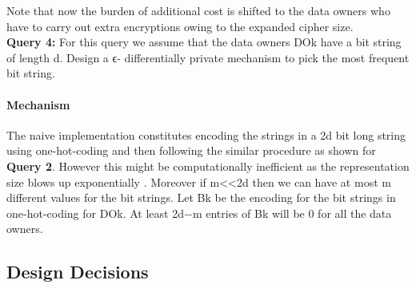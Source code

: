  Note that now the burden of additional cost is shifted to the data owners who have to carry out extra encryptions owing to the expanded cipher size.\\\textbf{Query 4:} For this query we assume that the data owners DOk  have  a bit string of length d. Design a ϵ- differentially private mechanism to pick the most frequent bit string. \paragraph{Mechanism}  The naive implementation constitutes encoding the strings in a 2d bit long string using one-hot-coding and then following the similar procedure as shown for \textbf{Query 2}. However this might be computationally inefficient  as the representation size blows up exponentially . Moreover if m<<2d then we can have at most m different values  for the bit strings. Let Bk be the encoding for the bit strings in one-hot-coding for DOk. At least 2d−m entries of Bk will be 0 for all the data owners. \\
\subsection{Design Decisions}
